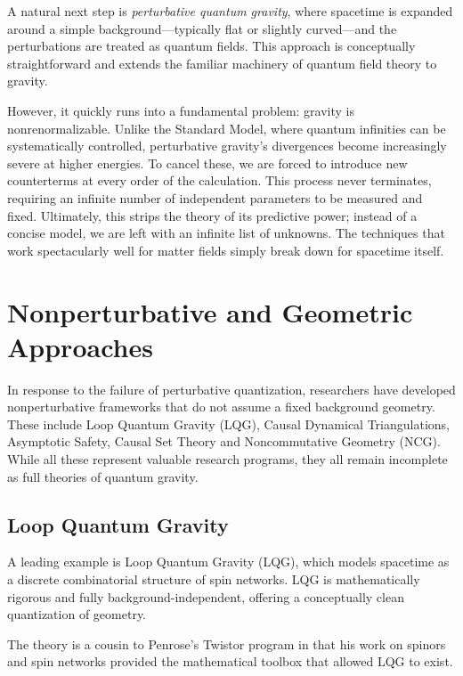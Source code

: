 A natural next step is \emph{perturbative quantum gravity}, where spacetime is expanded around a simple background—typically flat or slightly curved—and the perturbations are treated as quantum fields. This approach is conceptually straightforward and extends the familiar machinery of quantum field theory to gravity.

However, it quickly runs into a fundamental problem: gravity is nonrenormalizable. Unlike the Standard Model, where quantum infinities can be systematically controlled, perturbative gravity's divergences become increasingly severe at higher energies. To cancel these, we are forced to introduce new counterterms at every order of the calculation. This process never terminates, requiring an infinite number of independent parameters to be measured and fixed. Ultimately, this strips the theory of its predictive power; instead of a concise model, we are left with an infinite list of unknowns. The techniques that work spectacularly well for matter fields simply break down for spacetime itself.

\section{Nonperturbative and Geometric Approaches}

In response to the failure of perturbative quantization, researchers have developed nonperturbative frameworks that do not assume a fixed background geometry. These include Loop Quantum Gravity (LQG), Causal Dynamical Triangulations, Asymptotic Safety, Causal Set Theory and Noncommutative Geometry (NCG). While all these represent valuable research programs, they all remain incomplete as full theories of quantum gravity.


\subsection*{Loop Quantum Gravity}

A leading example is Loop Quantum Gravity (LQG), which models spacetime as a discrete combinatorial structure of spin networks. LQG is mathematically rigorous and fully background-independent, offering a conceptually clean quantization of geometry.

The theory is a cousin to Penrose’s Twistor program in that his work on spinors and spin networks provided the mathematical toolbox that allowed LQG to exist.

